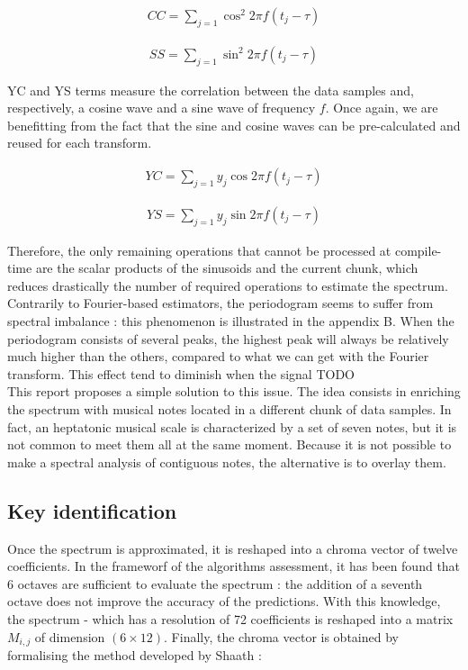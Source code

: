 \documentclass[letterpaper]{article}
\begin{document}
\begin{align}
CC = \sum\limits_{j=1} \cos^{2} 2\pi f (t_{j} - \tau)
\label{fig:cc}
\end{align}

\begin{align}
SS = \sum\limits_{j=1} \sin^{2} 2\pi f (t_{j} - \tau)
\label{fig:ss}
\end{align}

YC and YS terms measure the correlation between the data samples and, respectively, a cosine wave and a sine wave of frequency $f$. Once again, we are
benefitting from the fact that the sine and cosine waves can be pre-calculated and reused for each transform.

\begin{align}
YC = \sum\limits_{j=1} y_{j}\cos 2\pi f (t_{j} - \tau)
\end{align}

\begin{align}
YS = \sum\limits_{j=1} y_{j}\sin 2\pi f (t_{j} - \tau)
\end{align}

Therefore, the only remaining operations that cannot be processed at compile-time are the scalar products of the sinusoids and the current chunk, which
reduces drastically the number of required operations to estimate the spectrum.\\

Contrarily to Fourier-based
estimators, the periodogram seems to suffer from spectral imbalance : this phenomenon is illustrated in the appendix B. When the periodogram consists of several peaks, the highest peak will always be relatively much higher than the others, compared to what we can get with the Fourier transform. This effect tend to diminish when the signal TODO \\

This report proposes a simple solution to this issue. The idea consists in enriching the spectrum with musical notes located in a different chunk of data samples. In fact, an heptatonic musical scale is characterized by a set of seven notes, but it is
not common to meet them all at the same moment. Because it is not possible to make a spectral analysis of contiguous notes, the alternative is to overlay them.

\subsection{Key identification}

Once the spectrum is approximated, it is reshaped into a chroma vector of twelve coefficients. In the frameworf of the algorithms assessment, it has been found that 6 octaves are sufficient to evaluate the spectrum : the addition of a seventh octave does not improve the accuracy of the predictions. With this knowledge, the spectrum - which has a resolution of 72 coefficients is reshaped into a matrix $M_{i, j}$ of dimension $(6 \times 12)$. Finally, the chroma vector is obtained by formalising the method developed by Sha\textquotesingle ath :
\end{document}

